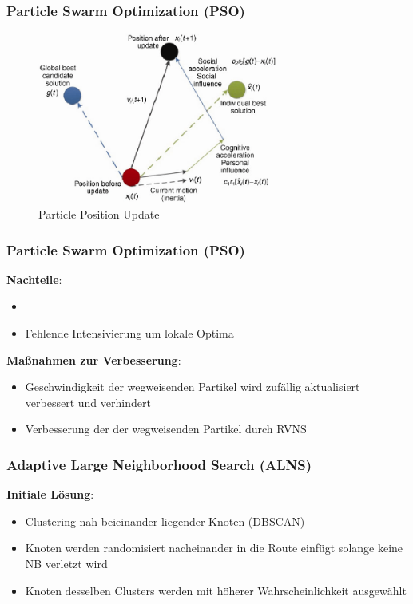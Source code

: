 \documentclass{beamer}
\begin{document}
\begin{frame}
  \frametitle{Particle Swarm Optimization (PSO)}
  \begin{figure}
    \includegraphics[width=0.7\textwidth]{img/PSO.png}
  \caption*{Particle Position Update}
  \end{figure}
\end{frame}

\begin{frame}
  \frametitle{Particle Swarm Optimization (PSO)}
  \textbf{Nachteile}:
  \begin{itemize}
    \item {}
    \item Fehlende Intensivierung um lokale Optima
  \end{itemize}
  \textbf{Maßnahmen zur Verbesserung}:
  \begin{itemize}
    \item Geschwindigkeit der wegweisenden Partikel wird zufällig aktualisiert \textrightarrow verbessert
     und verhindert 
    \item Verbesserung der  der wegweisenden Partikel durch RVNS
  \end{itemize}
\end{frame}

\begin{frame}
  \frametitle{Adaptive Large Neighborhood Search (ALNS)}
  \textbf{Initiale Lösung}:
  \begin{itemize}
    \item Clustering nah beieinander liegender Knoten (\textsc{DBSCAN})
    \item Knoten werden randomisiert nacheinander in die Route einfügt solange keine NB verletzt wird
    \item Knoten desselben Clusters werden mit höherer Wahrscheinlichkeit ausgewählt
  \end{itemize}
\end{frame}
\end{document}
